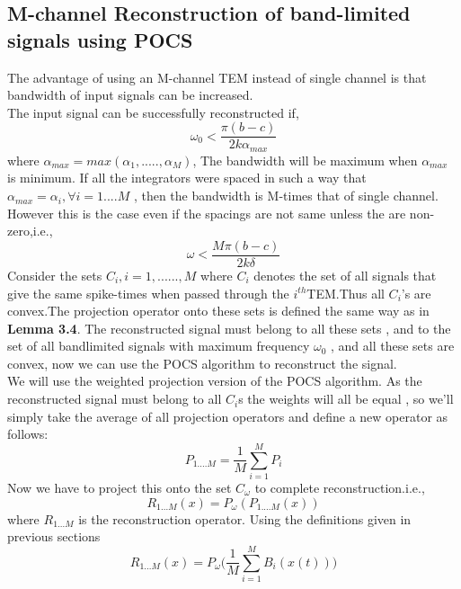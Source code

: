 \documentclass{article}
\begin{document}
\subsection{M-channel Reconstruction of band-limited signals using POCS}
The advantage of using an M-channel TEM instead of single channel is that bandwidth of input signals can be increased.\\
The input signal can be successfully reconstructed if,
\begin{equation}
    \omega_0 < \frac{\pi(b-c)}{2k\alpha_{max}}
\end{equation}
where $\alpha_{max} = max(\alpha_1,.....,\alpha_M)$, The bandwidth will be maximum when $\alpha_{max}$ is minimum. If all the integrators were spaced in such a way that $\alpha_{max} = \alpha_i , \forall i = 1....M$ , then the bandwidth is M-times that of single channel.\\
However this is the case even if the spacings are not same unless the are non-zero,i.e.,
\begin{equation}
    \omega < \frac{M\pi(b-c)}{2k\delta}
\end{equation}
Consider the sets $C_i , i = 1,...... ,M$ where $C_i$ denotes the set of all signals that give the same spike-times when passed through the $i^{th}$TEM.Thus all $C_i$'s are convex.The projection operator onto these sets is defined the same way as in \textbf{Lemma 3.4}.
The reconstructed signal must belong to all these sets , and to the set of all bandlimited signals with maximum frequency $\omega_0$ , and all these sets are convex, now we can use the POCS algorithm to reconstruct the signal.\\
We will use the weighted projection version of the POCS algorithm. As the reconstructed signal must belong to all $C_i$s the weights will all be equal , so we'll simply take the average of all projection operators and define a new operator as follows:
\begin{equation*}
    P_{1....M} = \frac{1}{M}\sum_{i=1}^{M}P_i 
\end{equation*}
Now we have to project this onto the set $C_{\omega}$ to complete reconstruction.i.e.,
\begin{equation*}
    R_{1...M}(x) = P_{\omega}(P_{1....M}(x))
\end{equation*}
where $R_{1...M}$ is the reconstruction operator.
Using the definitions given in previous sections
\begin{equation*}
    R_{1...M}(x) = P_{\omega}\Big(\frac{1}{M}\sum_{i=1}^{M}B_{i}(x(t))\Big)
\end{equation*}
\end{document}
